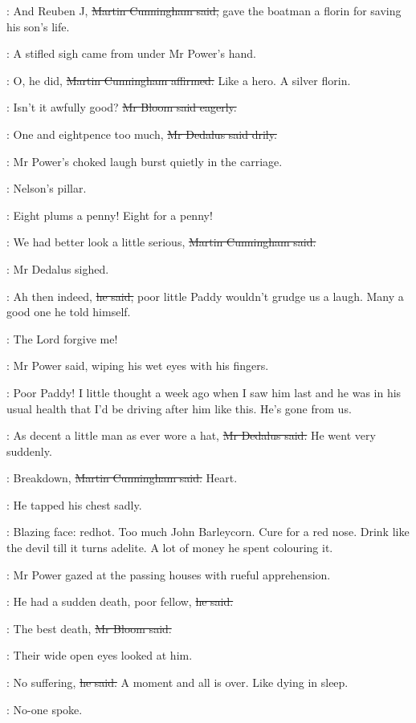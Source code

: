 \cunningham:
And Reuben J,
\sout{Martin Cunningham said,}
gave the boatman a florin for saving his son's life.

:
A stifled sigh came from under Mr Power's hand.

\cunningham:
O, he did,
\sout{Martin Cunningham affirmed.}
Like a hero.
A silver florin.

\Bloom:
Isn't it awfully good?
\sout{Mr Bloom said eagerly.}

\simon:
One and eightpence too much,
\sout{Mr Dedalus said drily.}

:
Mr Power's choked laugh burst quietly in the carriage.

\BloomInt:
Nelson's pillar.

\woman:
Eight plums a penny!
Eight for a penny!

\cunningham:
We had better look a little serious,
\sout{Martin Cunningham said.}

:
Mr Dedalus sighed.

\simon:
Ah then indeed,
\sout{he said,}
poor little Paddy wouldn't grudge us a laugh.
Many a good one he told himself.

\power:
The Lord forgive me!

:
Mr Power said,
wiping his wet eyes with his fingers.

\power:
Poor Paddy!
I little thought a week ago
when I saw him last
and he was in his usual health
that I'd be driving after him like this.
He's gone from us.

\simon:
As decent a little man as ever wore a hat,
\sout{Mr Dedalus said.}
He went very suddenly.

\cunningham:
Breakdown,
\sout{Martin Cunningham said.}
Heart.

:
He tapped his chest sadly.

\BloomInt:
Blazing face:
redhot.
Too much John Barleycorn.
Cure for a red nose.
Drink like the devil till it turns adelite.
A lot of money he spent colouring it.

:
Mr Power gazed at the passing houses with rueful apprehension.

\power:
He had a sudden death, poor fellow,
\sout{he said.}

\Bloom:
The best death,
\sout{Mr Bloom said.}

:
Their wide open eyes looked at him.

\Bloom:
No suffering,
\sout{he said.}
A moment and all is over.
Like dying in sleep.

:
No-one spoke.

